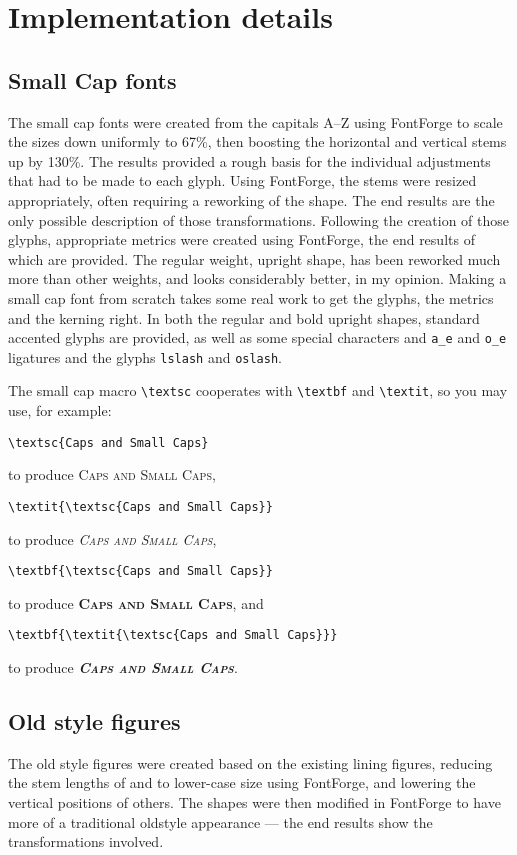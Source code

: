 \documentclass[11pt]{article}
\begin{document}
\section{Implementation details}
\subsection{Small Cap fonts}
The small cap fonts were created from the capitals A--Z using FontForge to scale the sizes down uniformly to 67\%, then boosting the horizontal and vertical stems up by 130\%. The results provided a rough basis for the individual adjustments that had to be made to each glyph. Using FontForge, the stems were resized appropriately, often requiring a reworking of the shape. The end results are the only possible description of those transformations. Following the creation of those glyphs,  appropriate metrics were created using FontForge, the end results of which are provided. 
The regular weight, upright shape, has been reworked much more than other weights, and looks considerably better, in my opinion. Making a small cap font from scratch takes some real work to get the glyphs, the metrics and the kerning right. In both the regular and bold upright shapes, standard accented glyphs are provided, as well as some special characters and \verb|a_e| and \verb|o_e| ligatures and the glyphs \texttt{lslash} and \texttt{oslash}.

The small cap macro \verb|\textsc| cooperates with \verb|\textbf| and \verb|\textit|, so you may use, for example:
\begin{verbatim}
\textsc{Caps and Small Caps}
\end{verbatim}
to produce \textsc{Caps and Small Caps},
\begin{verbatim}
\textit{\textsc{Caps and Small Caps}}
\end{verbatim}
to produce \textit{\textsc{Caps and Small Caps}},
\begin{verbatim}
\textbf{\textsc{Caps and Small Caps}}
\end{verbatim}
to produce \textbf{\textsc{Caps and Small Caps}}, and
\begin{verbatim}
\textbf{\textit{\textsc{Caps and Small Caps}}}
\end{verbatim}
to produce \textbf{\textit{\textsc{Caps and Small Caps}}}.

\subsection{Old style figures}
The old style figures were created based on the existing lining figures, reducing the stem lengths of  and  to lower-case size using FontForge, and lowering the vertical positions of others. The shapes were then modified in FontForge to have more of a traditional oldstyle appearance --- the end results  show the transformations involved.
\end{document}
